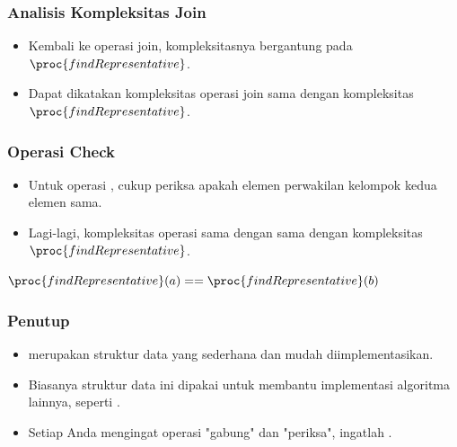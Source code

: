 \begin{frame}
\frametitle{Analisis Kompleksitas Join}
\begin{itemize}
  \item Kembali ke operasi join, kompleksitasnya bergantung pada $\proc{findRepresentative}$.
  \item Dapat dikatakan kompleksitas operasi join sama dengan kompleksitas $\proc{findRepresentative}$.
\end{itemize}
\end{frame}

\begin{frame}
\frametitle{Operasi Check}
\begin{itemize}
  \item Untuk operasi , cukup periksa apakah elemen perwakilan kelompok kedua elemen sama.
  \item Lagi-lagi, kompleksitas operasi  sama dengan sama dengan kompleksitas $\proc{findRepresentative}$.
\end{itemize}
\begin{codebox}
\li   \Return $\proc{findRepresentative}(a) == \proc{findRepresentative}(b)$
\end{codebox}
\end{frame}

\begin{frame}
\frametitle{Penutup}
\begin{itemize}
  \item \pDjs merupakan struktur data yang sederhana dan mudah diimplementasikan.
  \item Biasanya struktur data ini dipakai untuk membantu implementasi algoritma lainnya, seperti .
  \item Setiap Anda mengingat operasi "gabung" dan "periksa", ingatlah \pdjs.
\end{itemize}
\end{frame}




